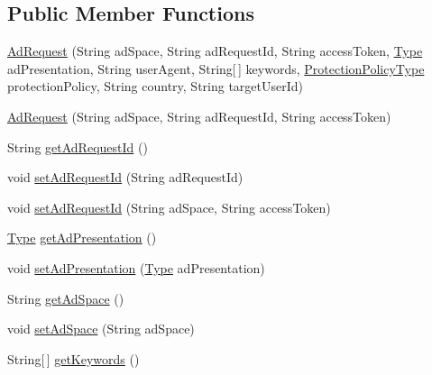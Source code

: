 \subsection*{Public Member Functions}
\begin{DoxyCompactItemize}
\item 
\hyperlink{classcom_1_1bluevia_1_1ad_1_1data_1_1AdRequest_aaadddf3802e52768df78b58e8e957f5a}{AdRequest} (String adSpace, String adRequestId, String accessToken, \hyperlink{classcom_1_1bluevia_1_1ad_1_1data_1_1AdRequest_a09c6520d8fe767e50b3629a4a3583ef3}{Type} adPresentation, String userAgent, String\mbox{[}$\,$\mbox{]} keywords, \hyperlink{classcom_1_1bluevia_1_1ad_1_1data_1_1AdRequest_abd707475c19957f294689451d338c099}{ProtectionPolicyType} protectionPolicy, String country, String targetUserId)
\item 
\hyperlink{classcom_1_1bluevia_1_1ad_1_1data_1_1AdRequest_acf7dea6c4c37289a00d8586e9f9bc72e}{AdRequest} (String adSpace, String adRequestId, String accessToken)
\item 
String \hyperlink{classcom_1_1bluevia_1_1ad_1_1data_1_1AdRequest_af9d26a30fb02f9db8864825c1bc07053}{getAdRequestId} ()
\item 
void \hyperlink{classcom_1_1bluevia_1_1ad_1_1data_1_1AdRequest_add3a4a8fada61890da52c60d0743cf6c}{setAdRequestId} (String adRequestId)
\item 
void \hyperlink{classcom_1_1bluevia_1_1ad_1_1data_1_1AdRequest_a04998f3d7b335cec27b63f15c1be442f}{setAdRequestId} (String adSpace, String accessToken)
\item 
\hyperlink{classcom_1_1bluevia_1_1ad_1_1data_1_1AdRequest_a09c6520d8fe767e50b3629a4a3583ef3}{Type} \hyperlink{classcom_1_1bluevia_1_1ad_1_1data_1_1AdRequest_a2b4e23bbb565ba944c2c7c03abb1a06d}{getAdPresentation} ()
\item 
void \hyperlink{classcom_1_1bluevia_1_1ad_1_1data_1_1AdRequest_a06c975bb9bb2a708fa8c9f0a6c5d813a}{setAdPresentation} (\hyperlink{classcom_1_1bluevia_1_1ad_1_1data_1_1AdRequest_a09c6520d8fe767e50b3629a4a3583ef3}{Type} adPresentation)
\item 
String \hyperlink{classcom_1_1bluevia_1_1ad_1_1data_1_1AdRequest_afe4634dcef448c5c44516cf969ceae8d}{getAdSpace} ()
\item 
void \hyperlink{classcom_1_1bluevia_1_1ad_1_1data_1_1AdRequest_a7f06a1f5d0a32f88e065402bd1433777}{setAdSpace} (String adSpace)
\item 
String\mbox{[}$\,$\mbox{]} \hyperlink{classcom_1_1bluevia_1_1ad_1_1data_1_1AdRequest_a2aa8259d295519f0fd7e6b4feb7a80dc}{getKeywords} ()

\end{DoxyCompactItemize}
